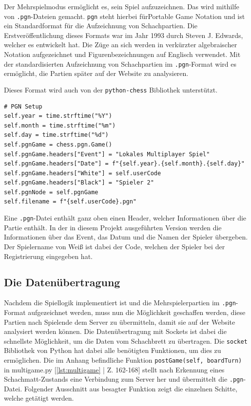 Der Mehrspielmodus ermöglicht es, sein Spiel aufzuzeichnen. Das wird mithilfe von \verb|.pgn|-Dateien gemacht. 
\verb|pgn| steht hierbei für\glqq Portable Game Notation\grqq{} und ist ein Standardformat für die Aufzeichnung von 
Schachpartien. Die Erstveröffentlichung dieses Formats war im Jahr 1993 durch Steven J. Edwards, welcher es entwickelt 
hat. Die Züge an sich werden in verkürzter algebraischer Notation aufgezeichnet und Figurenbezeichnungen auf Englisch 
verwendet. \cite{PortableGameNotation} Mit der standardisierten Aufzeichnung von Schachpartien im \verb|.pgn|-Format 
wird es ermöglicht, die Partien später auf der Website zu analysieren.

Dieses Format wird auch von der \verb|python-chess| Bibliothek unterstützt.\\

\begin{scriptsize}
\begin{lstlisting}[captionpos=b, caption={Erstellen der PGN-Header}, label={lst:pgnHeader}]
# PGN Setup
self.year = time.strftime("%Y")
self.month = time.strftime("%m")
self.day = time.strftime("%d")
self.pgnGame = chess.pgn.Game()
self.pgnGame.headers["Event"] = "Lokales Multiplayer Spiel"
self.pgnGame.headers["Date"] = f"{self.year}.{self.month}.{self.day}"
self.pgnGame.headers["White"] = self.userCode
self.pgnGame.headers["Black"] = "Spieler 2"
self.pgnNode = self.pgnGame
self.filename = f"{self.userCode}.pgn"
\end{lstlisting}
\end{scriptsize}

Eine \verb|.pgn|-Datei enthält ganz oben einen Header, welcher Informationen über die Partie enthält. In der in diesem 
Projekt ausgeführten Version werden die Informationen über das Event, das Datum und die Namen der Spieler übergeben. 
Der Spielername von Weiß ist dabei der Code, welchen der Spieler bei der Registrierung eingegeben hat.

\subsection{Die Datenübertragung}
Nachdem die Spiellogik implementiert ist und die Mehrspielerpartien im \verb|.pgn|-Format aufgezeichnet werden, muss 
nun die Möglichkeit geschaffen werden, diese Partien nach Spielende dem Server zu übermitteln, damit sie auf der 
Website analysiert werden können. Die Datenübertragung mit Sockets ist dabei die schnellste Möglichkeit, um die Daten 
vom Schachbrett zu übertragen.
Die \verb|socket| Bibliothek von Python hat dabei alle benötigten Funktionen, um dies zu ermöglichen. Die im Anhang 
befindliche Funktion
\verb|postGame(self, boardTurn)| in multigame.py [\ref{lst:multigame} | Z. 162-168] stellt nach Erkennung eines 
Schachmatt-Zustands eine Verbindung zum Server her und übermittelt die \verb|.pgn|-Datei. Folgender Ausschnitt aus 
besagter Funktion zeigt die einzelnen Schitte, welche getätigt werden.\\

